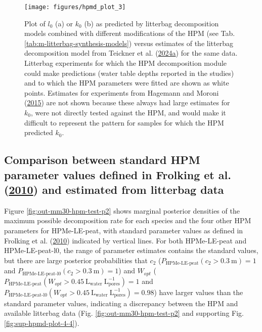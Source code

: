 \documentclass[
  12pt,
]{article}
\begin{document}
\begin{figure}[H]

{\centering \texttt{[image: figures/hpmd\_plot\_3]} 

}

\caption{Plot of \(l_0\) (a) or \(k_0\) (b) as predicted by litterbag decomposition models combined with different modifications of the HPM (see Tab. \ref{tab:m-litterbag-synthesis-models}) versus estimates of the litterbag decomposition model from Teickner et al. (\protect\hyperlink{ref-Teickner.2024}{2024a}) for the same data. Litterbag experiments for which the HPM decomposition module could make predictions (water table depths reported in the studies) and to which the HPM parameters were fitted are shown as white points. Estimates for experiments from Hagemann and Moroni (\protect\hyperlink{ref-Hagemann.2015}{2015}) are not shown because these always had large estimates for \(k_0\), were not directly tested against the HPM, and would make it difficult to represent the pattern for samples for which the HPM predicted \(k_0\).}\label{fig:out-sdm-all-models-p2}
\end{figure}

\hypertarget{comparison-between-standard-hpm-parameter-values-defined-in-frolking.2010-and-estimated-from-litterbag-data}{%
\subsection{\texorpdfstring{Comparison between standard HPM parameter values defined in Frolking et al. (\protect\hyperlink{ref-Frolking.2010}{2010}) and estimated from litterbag data}{Comparison between standard HPM parameter values defined in Frolking et al. (2010) and estimated from litterbag data}}\label{comparison-between-standard-hpm-parameter-values-defined-in-frolking.2010-and-estimated-from-litterbag-data}}

Figure \ref{fig:out-mm30-hpm-test-p2} shows marginal posterior densities of the maximum possible decomposition rate for each species and the four other HPM parameters for HPMe-LE-peat, with standard parameter values as defined in Frolking et al. (\protect\hyperlink{ref-Frolking.2010}{2010}) indicated by vertical lines. For both HPMe-LE-peat and HPMe-LE-peat-l0, the range of parameter estimates contains the standard values, but there are large posterior probabilities that \(c_2\) (\(P_\text{HPMe-LE-peat}(c_2>0.3~\mathrm{m}) = 1\) and \(P_\text{HPMe-LE-peat-l0}(c_2>0.3~\mathrm{m}) = 1\)) and \(W_{opt}\) (\(P_\text{HPMe-LE-peat}(W_{opt}>0.45~\mathrm{L}_\mathrm{water}~\mathrm{L}_\mathrm{pores}^{-1}) = 1\) and \(P_\text{HPMe-LE-peat-l0}(W_{opt}>0.45~\mathrm{L}_\mathrm{water}~\mathrm{L}_\mathrm{pores}^{-1}) = 0.98\)) have larger values than the standard parameter values, indicating a discrepancy between the HPM and available litterbag data (Fig. \ref{fig:out-mm30-hpm-test-p2} and supporting Fig. \ref{fig:sup-hpmd-plot-4-4}).
\end{document}
